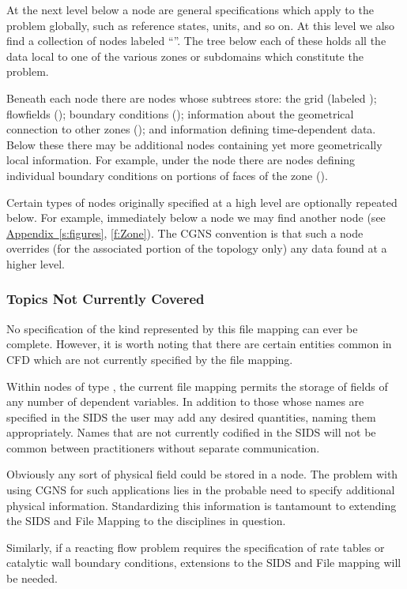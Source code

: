At the next level below a  node are general
specifications which apply to the problem globally, such as reference
states, units, and so on.
At this level we also find a collection of nodes labeled
``''.
The tree below each of these holds all the data local to one of the
various zones or subdomains which constitute the problem.

Beneath each  node there are nodes whose subtrees
store: the grid (labeled ); flowfields
(); boundary conditions ();
information about the geometrical connection to other zones
(); and information defining time-dependent
data. Below these there may be additional nodes containing yet more
geometrically local information. For example, under the 
node there are nodes defining individual boundary conditions on portions
of faces of the zone ().

Certain types of nodes originally specified at a high level are
optionally repeated below. For example, immediately below a
 node we may find another 
node (see \hyperref[s:figures]{Appendix~\ref*{s:figures}},
\autoref{f:Zone}). The CGNS convention is that such a node overrides
(for the associated portion of the topology only) any data found at a
higher level.

\subsubsection{Topics Not Currently Covered}
\label{s:notcovered}

No specification of the kind represented by this file mapping can ever
be complete. However, it is worth noting that there are certain entities
common in CFD which are not currently specified by the file mapping.

Within nodes of type , the current file mapping
permits the storage of fields of any number of dependent variables.
In addition to those whose names are specified in the SIDS the user may
add any desired quantities, naming them appropriately.
Names that are not currently codified in the SIDS will not be
common between practitioners without separate communication.

Obviously any sort of physical field could be stored in a
 node. The
problem with using CGNS for such applications lies in the probable
need to specify additional physical information.  Standardizing this
information is tantamount to extending the SIDS and File Mapping to the
disciplines in question.

Similarly, if a reacting flow problem requires the specification of rate
tables or catalytic wall boundary conditions, extensions to the SIDS and
File mapping will be needed.
